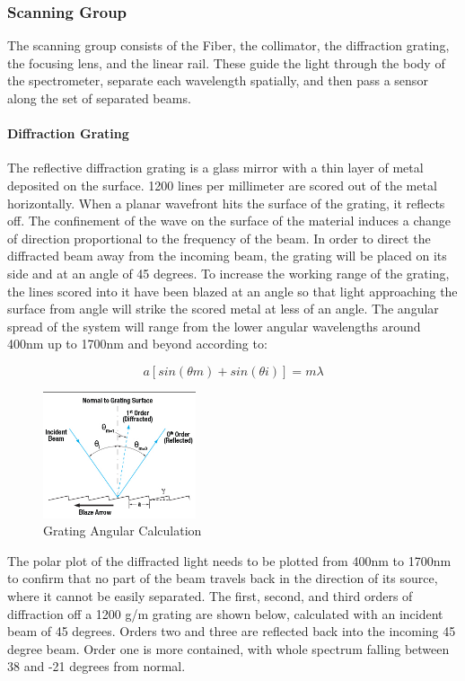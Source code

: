 \subsubsection{Scanning Group}

The scanning group consists of the Fiber, the collimator, the diffraction grating, the focusing lens, and the linear rail. These guide the light through the body of the spectrometer, separate each wavelength spatially, and then pass a sensor along the set of separated beams.

\paragraph{Diffraction Grating} The reflective diffraction grating is a glass mirror with a thin layer of metal deposited on the surface. 1200 lines per millimeter are scored out of the metal horizontally. When a planar wavefront hits the surface of the grating, it reflects off. The confinement of the wave on the surface of the material induces a change of direction proportional to the frequency of the beam. In order to direct the diffracted beam away from the incoming beam, the grating will be placed on its side and at an angle of 45 degrees. To increase the working range of the grating, the lines scored into it have been blazed at an angle so that light approaching the surface from angle will strike the scored metal at less of an angle. The angular spread of the system will range from the lower angular wavelengths around 400nm up to 1700nm and beyond according to: 

\begin{equation}
    a[sin(\theta m)+sin(\theta i)] = m\lambda
\end{equation}

\begin{figure}[H]
    \caption{Grating Angular Calculation}
    \centering
    \includegraphics[width=0.4\textwidth]{images/ThorlabsGratingTutorial.png}
\end{figure}

The polar plot of the diffracted light needs to be plotted from 400nm to 1700nm to confirm that no part of the beam travels back in the direction of its source, where it cannot be easily separated. The first, second, and third orders of diffraction off a 1200 g/m grating are shown below, calculated with an incident beam of 45 degrees. Orders two and three are reflected back into the incoming 45 degree beam. Order one is more contained, with whole spectrum falling between 38 and -21 degrees from normal.

